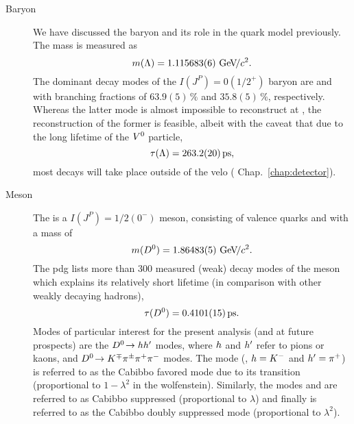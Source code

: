\begin{description}
    \item[\Lz Baryon] We have discussed the \Lz baryon and its role in the quark model previously. The mass is measured as
    \begin{equation*}
        m({\Lambda}) = 1.115683(6)\,{\mathrm{\,Ge\kern -0.1em V\!/}c^2}.
    \end{equation*}
    The dominant decay modes of the $I(J^P) = 0(1/2^+)$ baryon are \decay{\Lz}{\proton\pim} and \decay{\Lz}{\neutron\piz} with branching fractions of $63.9(5)\,\%$ and $35.8(5)\,\%$, respectively. Whereas the latter mode is almost impossible to reconstruct at \lhcb, the reconstruction of the former is feasible, albeit with the caveat that due to the long lifetime of the $V^0$ particle,
    \begin{equation*}
        \tau({\Lambda}) = 263.2(20) \,\text{ps},
    \end{equation*}
    most decays will take place outside of the \gls{velo} (\cf{} Chap.~\ref{chap:detector}). 
    \item[\Dz Meson] The \Dz is a $I(J^P) = 1/2(0^-)$ meson, consisting of valence quarks \cquark and \uquarkbar with a mass of
    \begin{equation*}
        m({{D}^0}) = 1.86483(5)\,{\mathrm{\,Ge\kern -0.1em V\!/}c^2}.
    \end{equation*}
    The \gls{pdg} lists more than 300 measured (weak) decay modes of the \Dz meson which explains its relatively short lifetime (in comparison with other weakly decaying hadrons),
    \begin{equation*}
        \tau({{D}^0}) = 0.4101(15) \,\text{ps}.
    \end{equation*}
    Modes of particular interest for the present analysis (and at future prospects) are the ${{D}^0}\!\rightarrow hh'$ modes, where $h$ and $h'$ refer to pions or kaons, and ${{D}^0}\!\rightarrow {\ensuremath{{K}^\mp}}{\ensuremath{{\pi}^\pm}}{\ensuremath{{\pi}^+}}{\ensuremath{{\pi}^-}}$ modes. The mode \decay{\Dz}{\Km\pip} (\ie{}, $h={{K}^-}$ and $h'={{\pi}^+}$) is referred to as the Cabibbo favored mode due to its \decay{\cquark}{\squark\uquark\dquarkbar} transition (proportional to $1-\lambda^2$ in the \gls{wolfenstein}). Similarly, the modes \decay{\Dz}{\Kp\Km} and \decay{\Dz}{\pip\pim} are referred to as Cabibbo suppressed (proportional to $\lambda$) and finally \decay{\Dz}{\Kp\pim} is referred to as the Cabibbo doubly suppressed mode (proportional to $\lambda^2$).
\end{description}

